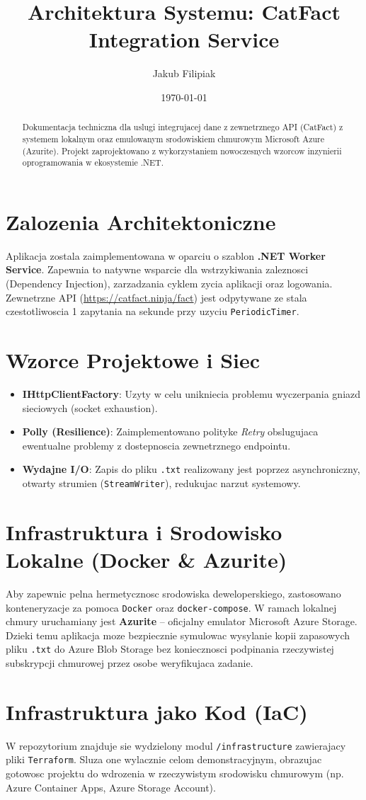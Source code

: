 \documentclass[11pt,a4paper]{article}
\title{\textbf{Architektura Systemu: CatFact Integration Service}}
\author{Jakub Filipiak}
\date{\today}
\begin{document}
\maketitle

\begin{abstract}
Dokumentacja techniczna dla uslugi integrujacej dane z zewnetrznego API (CatFact) z systemem lokalnym oraz emulowanym srodowiskiem chmurowym Microsoft Azure (Azurite). Projekt zaprojektowano z wykorzystaniem nowoczesnych wzorcow inzynierii oprogramowania w ekosystemie .NET.
\end{abstract}

\section{Zalozenia Architektoniczne}
Aplikacja zostala zaimplementowana w oparciu o szablon \textbf{.NET Worker Service}. Zapewnia to natywne wsparcie dla wstrzykiwania zaleznosci (Dependency Injection), zarzadzania cyklem zycia aplikacji oraz logowania.
Zewnetrzne API (\url{https://catfact.ninja/fact}) jest odpytywane ze stala czestotliwoscia 1 zapytania na sekunde przy uzyciu \texttt{PeriodicTimer}.

\section{Wzorce Projektowe i Siec}
\begin{itemize}
    \item \textbf{IHttpClientFactory}: Uzyty w celu unikniecia problemu wyczerpania gniazd sieciowych (socket exhaustion).
    \item \textbf{Polly (Resilience)}: Zaimplementowano polityke \textit{Retry} obslugujaca ewentualne problemy z dostepnoscia zewnetrznego endpointu.
    \item \textbf{Wydajne I/O}: Zapis do pliku \texttt{.txt} realizowany jest poprzez asynchroniczny, otwarty strumien (\texttt{StreamWriter}), redukujac narzut systemowy.
\end{itemize}

\section{Infrastruktura i Srodowisko Lokalne (Docker \& Azurite)}
Aby zapewnic pelna hermetycznosc srodowiska deweloperskiego, zastosowano konteneryzacje za pomoca \texttt{Docker} oraz \texttt{docker-compose}.
W ramach lokalnej chmury uruchamiany jest \textbf{Azurite} -- oficjalny emulator Microsoft Azure Storage.
Dzieki temu aplikacja moze bezpiecznie symulowac wysylanie kopii zapasowych pliku \texttt{.txt} do Azure Blob Storage bez koniecznosci podpinania rzeczywistej subskrypcji chmurowej przez osobe weryfikujaca zadanie.

\section{Infrastruktura jako Kod (IaC)}
W repozytorium znajduje sie wydzielony modul \texttt{/infrastructure} zawierajacy pliki \texttt{Terraform}. Sluza one wylacznie celom demonstracyjnym, obrazujac gotowosc projektu do wdrozenia w rzeczywistym srodowisku chmurowym (np. Azure Container Apps, Azure Storage Account).
\end{document}
